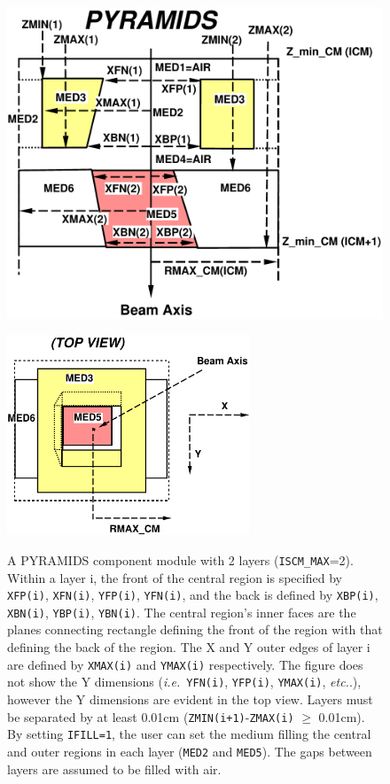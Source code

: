 \documentclass[12pt,twoside]{article}
\newcommand{\ie}{{\em i.e.}}
\newcommand{\etc}{{\em etc.}}
\begin{document}
\begin{figure}[htp]
\leavevmode
\hfill
\includegraphics[height=10cm]{figures/pyramidsd}
\vspace{0.1cm}
\includegraphics[height=6.0cm]{figures/pyramidstop}
\caption[PYRAMIDS CM geometry]
{A PYRAMIDS component module with 2 layers ({\tt ISCM\_MAX}=2).  Within a
layer i, the front of the central region is specified by
{\tt XFP(i)}, {\tt XFN(i)}, {\tt YFP(i)}, {\tt YFN(i)}, and the back
is defined by {\tt XBP(i)}, {\tt XBN(i)}, {\tt YBP(i)},
{\tt YBN(i)}.
The central region's inner faces are the planes connecting rectangle
defining the front of the region with that defining the back of the region.
The X and Y outer edges of
layer i are defined by {\tt XMAX(i)} and {\tt YMAX(i)} respectively.
The figure does
not show the Y dimensions (\ie\ {\tt YFN(i)}, {\tt YFP(i)}, {\tt YMAX(i)}, \etc.),
however the Y
dimensions are evident in the top view.  Layers must be separated by at
least 0.01cm ({\tt ZMIN(i+1)}-{\tt ZMAX(i)} $\geq$ 0.01cm).  By setting
{\tt IFILL=1},
the user can set the medium filling the central and outer regions
in each layer ({\tt MED2} and {\tt MED5}).  The gaps
between layers are assumed to be filled with air.}
\label{fig_PYRAMIDSD}
\end{figure}
\end{document}
